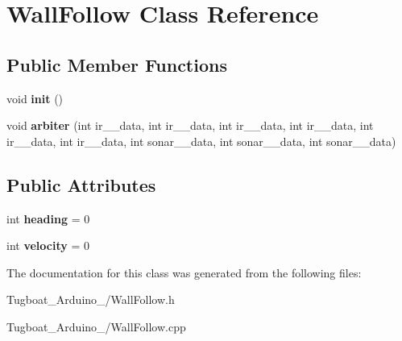 \hypertarget{class_wall_follow}{}\section{Wall\+Follow Class Reference}
\label{class_wall_follow}
\subsection*{Public Member Functions}
\begin{DoxyCompactItemize}
\item 
void {\bfseries init} ()\hypertarget{class_wall_follow_aa0f119c686007d6a4365d78b8502a08c}{}\label{class_wall_follow_aa0f119c686007d6a4365d78b8502a08c}

\item 
void {\bfseries arbiter} (int ir\+\_\+\_\+data, int ir\+\_\+\_\+data, int ir\+\_\+\_\+data, int ir\+\_\+\_\+data, int ir\+\_\+\_\+data, int ir\+\_\+\_\+data, int sonar\+\_\+\_\+data, int sonar\+\_\+\_\+data, int sonar\+\_\+\_\+data)\hypertarget{class_wall_follow_a0920b37fe9190d08a1ea589597de5a6e}{}\label{class_wall_follow_a0920b37fe9190d08a1ea589597de5a6e}

\end{DoxyCompactItemize}
\subsection*{Public Attributes}
\begin{DoxyCompactItemize}
\item 
int {\bfseries heading} = 0\hypertarget{class_wall_follow_a54db9516ddc4658c168e90e25c1d68af}{}\label{class_wall_follow_a54db9516ddc4658c168e90e25c1d68af}

\item 
int {\bfseries velocity} = 0\hypertarget{class_wall_follow_a4000d628de8ce5ebe0131dd40d546846}{}\label{class_wall_follow_a4000d628de8ce5ebe0131dd40d546846}

\end{DoxyCompactItemize}


The documentation for this class was generated from the following files\+:\begin{DoxyCompactItemize}
\item 
Tugboat\+\_\+\+Arduino\+\_/Wall\+Follow.\+h\item 
Tugboat\+\_\+\+Arduino\+\_/Wall\+Follow.\+cpp\end{DoxyCompactItemize}
